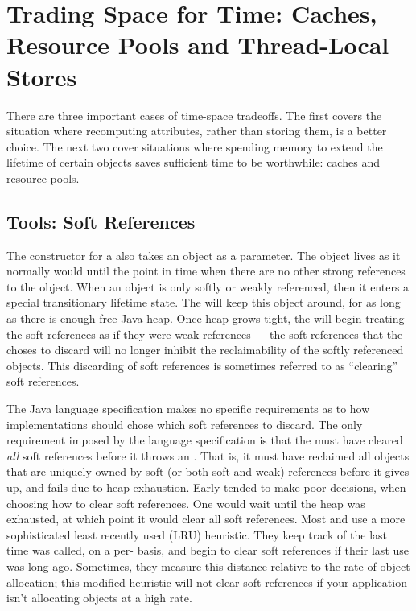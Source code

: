 \chapter{Trading Space for Time: Caches, Resource Pools and Thread-Local Stores}
\label{chapter:trading-space-for-time}

There are three important cases of time-space tradeoffs. The first covers
the situation where recomputing attributes, rather than storing them, is a better
choice. The next two cover situations where spending memory to extend the
lifetime of certain objects saves sufficient time to be worthwhile: caches and
resource pools.

\section{Tools: Soft References}

The constructor for a  also takes an object as a parameter.
The object lives as it normally would until the point in time when there are no
other strong references to the object. When an object is only softly or weakly
referenced, then it enters a special transitionary lifetime state. The \jre will
keep this object around, for as long as there is enough free Java heap. Once heap
grows tight, the \jre will begin treating the soft references as if they were
weak references --- the soft references that the \jre choses to discard will no
longer inhibit the reclaimability of the softly referenced objects. This
discarding of soft references is sometimes referred to as ``clearing'' soft
references.

The Java language specification makes no specific requirements as to how \jre
implementations should chose which soft references to discard. The only
requirement imposed by the language specification is that the \jre must have
cleared \emph{all} soft references before it throws an
. That is, it must have reclaimed all objects that
are uniquely owned by soft (or both soft and weak) references before it gives up,
and fails due to heap exhaustion. Early \jres tended to make poor decisions, when
choosing how to clear soft references. One \jre would wait until the heap was
exhausted, at which point it would clear all soft references. Most \javafive and
\javasix \jres use a more sophisticated least recently used (LRU) heuristic.
They keep track of the last time  was called, on a per-
basis, and begin to clear soft references if their last use was long ago.
Sometimes, they measure this distance relative to the rate of object allocation;
this modified heuristic will not clear soft references if your application isn't
allocating objects at a high rate.

